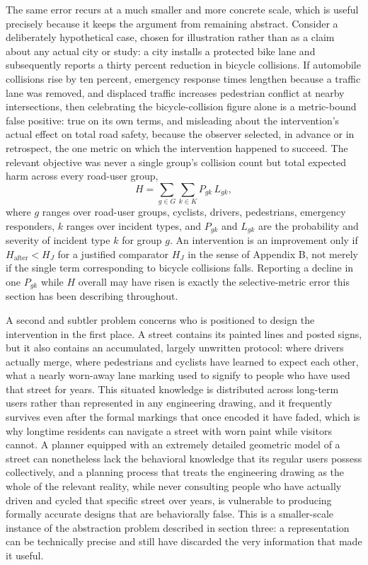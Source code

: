 \documentclass[11pt]{article}
\begin{document}
The same error recurs at a much smaller and more concrete scale, which is useful precisely because it keeps the argument from remaining abstract. Consider a deliberately hypothetical case, chosen for illustration rather than as a claim about any actual city or study: a city installs a protected bike lane and subsequently reports a thirty percent reduction in bicycle collisions. If automobile collisions rise by ten percent, emergency response times lengthen because a traffic lane was removed, and displaced traffic increases pedestrian conflict at nearby intersections, then celebrating the bicycle-collision figure alone is a metric-bound false positive: true on its own terms, and misleading about the intervention's actual effect on total road safety, because the observer selected, in advance or in retrospect, the one metric on which the intervention happened to succeed. The relevant objective was never a single group's collision count but total expected harm across every road-user group,
\[
H = \sum_{g \in G} \sum_{k \in K} P_{gk} \, L_{gk},
\]
where $g$ ranges over road-user groups, cyclists, drivers, pedestrians, emergency responders, $k$ ranges over incident types, and $P_{gk}$ and $L_{gk}$ are the probability and severity of incident type $k$ for group $g$. An intervention is an improvement only if $H_{\text{after}} < H_{J}$ for a justified comparator $H_J$ in the sense of Appendix B, not merely if the single term corresponding to bicycle collisions falls. Reporting a decline in one $P_{gk}$ while $H$ overall may have risen is exactly the selective-metric error this section has been describing throughout.

A second and subtler problem concerns who is positioned to design the intervention in the first place. A street contains its painted lines and posted signs, but it also contains an accumulated, largely unwritten protocol: where drivers actually merge, where pedestrians and cyclists have learned to expect each other, what a nearly worn-away lane marking used to signify to people who have used that street for years. This situated knowledge is distributed across long-term users rather than represented in any engineering drawing, and it frequently survives even after the formal markings that once encoded it have faded, which is why longtime residents can navigate a street with worn paint while visitors cannot. A planner equipped with an extremely detailed geometric model of a street can nonetheless lack the behavioral knowledge that its regular users possess collectively, and a planning process that treats the engineering drawing as the whole of the relevant reality, while never consulting people who have actually driven and cycled that specific street over years, is vulnerable to producing formally accurate designs that are behaviorally false. This is a smaller-scale instance of the abstraction problem described in section three: a representation can be technically precise and still have discarded the very information that made it useful.
\end{document}
